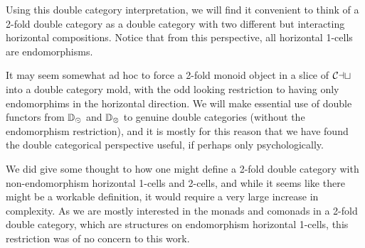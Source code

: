 Using this double category interpretation, we will find it convenient to think of a 2-fold double category as a double category with two different but interacting horizontal compositions. Notice that from this perspective, all horizontal 1-cells are endomorphisms.

\begin{remark}
	It may seem somewhat ad hoc to force a 2-fold monoid object in a slice of $\mathcal{Cat}$ into a double category mold, with the odd looking restriction to having only endomorphims in the horizontal direction. We will make essential use of double functors from $\mathbb{D}_{\odot}$ and $\mathbb{D}_{\otimes}$ to genuine double categories (without the endomorphism restriction), and it is mostly for this reason that we have found the double categorical perspective useful, if perhaps only psychologically.

	We did give some thought to how one might define a 2-fold double category with non-endomorphism horizontal 1-cells and 2-cells, and while it seems like there might be a workable definition, it would require a very large increase in complexity. As we are mostly interested in the monads and comonads in a 2-fold double category, which are structures on endomorphism horizontal 1-cells, this restriction was of no concern to this work.
\end{remark}


